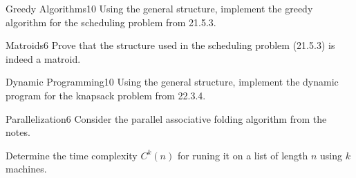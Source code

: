 \documentclass[a4paper]{article}
\begin{document}
\header

\begin{problem}{Greedy Algorithms}{10}
Using the general structure, implement the greedy algorithm for the scheduling problem from 21.5.3.
\end{problem}

\begin{problem}{Matroids}{6}
Prove that the structure used in the scheduling problem (21.5.3) is indeed a matroid.
\end{problem}

\begin{problem}{Dynamic Programming}{10}
Using the general structure, implement the dynamic program for the knapsack problem from 22.3.4.
\end{problem}

\begin{problem}{Parallelization}{6}
Consider the parallel associative folding algorithm from the notes.

Determine the time complexity $C^k(n)$ for runing it on a list of length $n$ using $k$ machines.
\end{problem}
\end{document}
